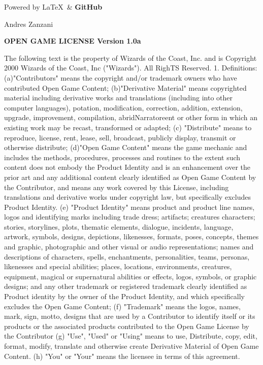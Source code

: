 \documentclass[a4paper,11pt,twoside,openany]{book}
\begin{document}
{\bigskip

Powered by \Large\LaTeX\ \normalfont\& \Large\textbf{GitHub}

\bigskip

Andres Zanzani


\normalsize

\pagebreak

{\footnotesize
\textbf{OPEN GAME LICENSE Version 1.0a}

The following text is the property of Wizards of the Coast, Inc. and is Copyright 2000 Wizards of the Coast, Inc ("Wizards"). All RighTS Reserved.
1. Definitions: (a)"Contributors" means the copyright and/or trademark owners who have contributed Open Game Content; (b)"Derivative Material" means copyrighted material including derivative works and translations (including into other computer languages), potation, modification, correction, addition, extension, upgrade, improvement, compilation, abridNarratoreent or other form in which an existing work may be recast, transformed or adapted; (c) "Distribute" means to reproduce, license, rent, lease, sell, broadcast, publicly display, transmit or otherwise distribute; (d)"Open Game Content" means the game mechanic and includes the methods, procedures, processes and routines to the extent such content does not embody the Product Identity and is an enhancement over the prior art and any additional content clearly identified as Open Game Content by the Contributor, and means any work covered by this License, including translations and derivative works under copyright law, but specifically excludes Product Identity. (e) "Product Identity" means product and product line names, logos and identifying marks including trade dress; artifacts; creatures characters; stories, storylines, plots, thematic elements, dialogue, incidents, language, artwork, symbols, designs, depictions, likenesses, formats, poses, concepts, themes and graphic, photographic and other visual or audio representations; names and descriptions of characters, spells, enchantments, personalities, teams, personas, likenesses and special abilities; places, locations, environments, creatures, equipment, magical or supernatural abilities or effects, logos, symbols, or graphic designs; and any other trademark or registered trademark clearly identified as Product identity by the owner of the Product Identity, and which specifically excludes the Open Game Content; (f) "Trademark" means the logos, names, mark, sign, motto, designs that are used by a Contributor to identify itself or its products or the associated products contributed to the Open Game License by the Contributor (g) "Use", "Used" or "Using" means to use, Distribute, copy, edit, format, modify, translate and otherwise create Derivative Material of Open Game Content. (h) "You" or "Your" means the licensee in terms of this agreement.
}}
\end{document}
